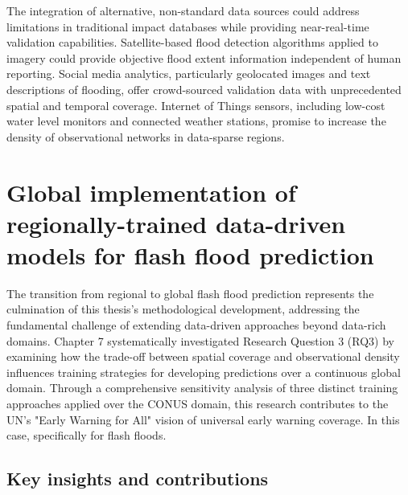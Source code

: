 The integration of alternative, non-standard data sources could address limitations in traditional impact databases while providing near-real-time validation capabilities. Satellite-based flood detection algorithms applied to imagery could provide objective flood extent information independent of human reporting. Social media analytics, particularly geolocated images and text descriptions of flooding, offer crowd-sourced validation data with unprecedented spatial and temporal coverage. Internet of Things sensors, including low-cost water level monitors and connected weather stations, promise to increase the density of observational networks in data-sparse regions.


\section{Global implementation of regionally-trained data-driven models for flash flood prediction}

The transition from regional to global flash flood prediction represents the culmination of this thesis's methodological development, addressing the fundamental challenge of extending data-driven approaches beyond data-rich domains. Chapter 7 systematically investigated Research Question 3 (RQ3) by examining how the trade-off between spatial coverage and observational density influences training strategies for developing predictions over a continuous global domain. Through a comprehensive sensitivity analysis of three distinct training approaches applied over the CONUS domain, this research contributes to the UN's "Early Warning for All" vision of universal early warning coverage. In this case, specifically for flash floods.


\subsection{Key insights and contributions}

